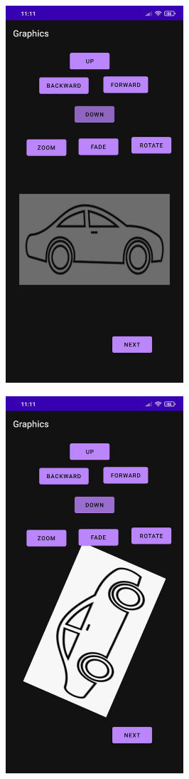 \documentclass[12pt,letterpaper]{article}
\begin{document}
\begin{figure}
    \centering
    \includegraphics[height=14cm, keepaspectratio]{Outputs/OP7.jpeg}
\end{figure}
\begin{figure}
    \centering
    \includegraphics[height=14cm, keepaspectratio]{Outputs/OP8.jpeg}
\end{figure}
\end{document}
